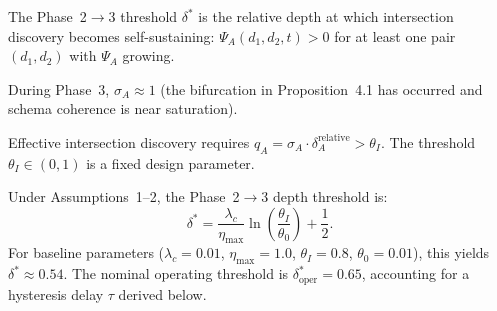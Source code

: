 
\begin{definition}
The Phase~2$\to$3 threshold $\delta^*$ is the relative depth at which
intersection discovery becomes self-sustaining: $\Psi_A(d_1,d_2,t) > 0$
for at least one pair $(d_1,d_2)$ with $\Psi_A$ growing.
\end{definition}

\begin{assumption}
During Phase~3, $\sigma_A \approx 1$ (the bifurcation in Proposition~4.1
has occurred and schema coherence is near saturation).
\end{assumption}

\begin{assumption}
Effective intersection discovery requires $q_A = \sigma_A \cdot \delta_A^{\text{relative}} > \theta_I$.
The threshold $\theta_I \in (0,1)$ is a fixed design parameter.
\end{assumption}

\begin{proposition}
\label{prop:depth-threshold}
Under Assumptions~1--2, the Phase~2$\to$3 depth threshold is:
\[
\delta^* = \frac{\lambda_c}{\eta_{\max}} \ln\!\left(\frac{\theta_I}{\theta_0}\right) + \frac{1}{2}.
\]
For baseline parameters ($\lambda_c = 0.01$, $\eta_{\max} = 1.0$,
$\theta_I = 0.8$, $\theta_0 = 0.01$), this yields $\delta^* \approx 0.54$.
The nominal operating threshold is $\delta^*_{\text{oper}} = 0.65$,
accounting for a hysteresis delay $\tau$ derived below.
\end{proposition}

